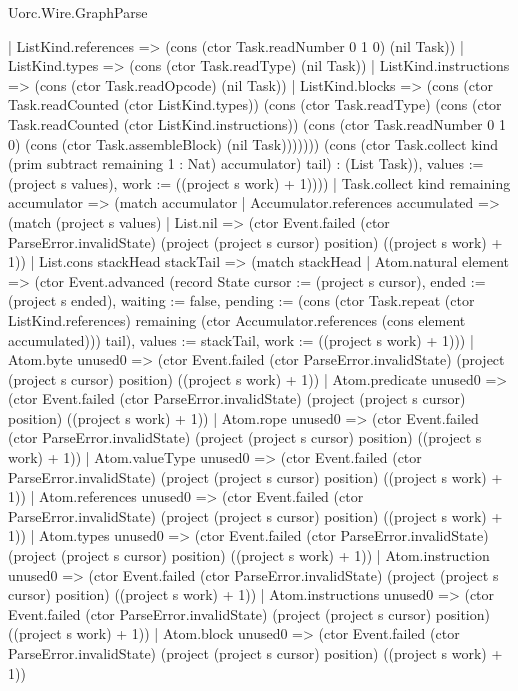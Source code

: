 \begin{lexlean}{Uorc.Wire.GraphParse}
\begin{semanticmodule}
{{        | ListKind.references => (cons (ctor Task.readNumber 0 1 0) (nil Task))
        | ListKind.types => (cons (ctor Task.readType) (nil Task))
        | ListKind.instructions => (cons (ctor Task.readOpcode) (nil Task))
        | ListKind.blocks => (cons (ctor Task.readCounted (ctor ListKind.types)) (cons (ctor Task.readType) (cons (ctor Task.readCounted (ctor ListKind.instructions)) (cons (ctor Task.readNumber 0 1 0) (cons (ctor Task.assembleBlock) (nil Task))))))) (cons (ctor Task.collect kind (prim subtract remaining 1 : Nat) accumulator) tail) : (List Task)), values := (project s values), work := ((project s work) + 1)})))
      | Task.collect kind remaining accumulator => (match accumulator
        | Accumulator.references accumulated => (match (project s values)
          | List.nil => (ctor Event.failed (ctor ParseError.invalidState) (project (project s cursor) position) ((project s work) + 1))
          | List.cons stackHead stackTail => (match stackHead
            | Atom.natural element => (ctor Event.advanced (record State {cursor := (project s cursor), ended := (project s ended), waiting := false, pending := (cons (ctor Task.repeat (ctor ListKind.references) remaining (ctor Accumulator.references (cons element accumulated))) tail), values := stackTail, work := ((project s work) + 1)}))
            | Atom.byte unused0 => (ctor Event.failed (ctor ParseError.invalidState) (project (project s cursor) position) ((project s work) + 1))
            | Atom.predicate unused0 => (ctor Event.failed (ctor ParseError.invalidState) (project (project s cursor) position) ((project s work) + 1))
            | Atom.rope unused0 => (ctor Event.failed (ctor ParseError.invalidState) (project (project s cursor) position) ((project s work) + 1))
            | Atom.valueType unused0 => (ctor Event.failed (ctor ParseError.invalidState) (project (project s cursor) position) ((project s work) + 1))
            | Atom.references unused0 => (ctor Event.failed (ctor ParseError.invalidState) (project (project s cursor) position) ((project s work) + 1))
            | Atom.types unused0 => (ctor Event.failed (ctor ParseError.invalidState) (project (project s cursor) position) ((project s work) + 1))
            | Atom.instruction unused0 => (ctor Event.failed (ctor ParseError.invalidState) (project (project s cursor) position) ((project s work) + 1))
            | Atom.instructions unused0 => (ctor Event.failed (ctor ParseError.invalidState) (project (project s cursor) position) ((project s work) + 1))
            | Atom.block unused0 => (ctor Event.failed (ctor ParseError.invalidState) (project (project s cursor) position) ((project s work) + 1))
}
\end{semanticmodule}
\end{lexlean}
